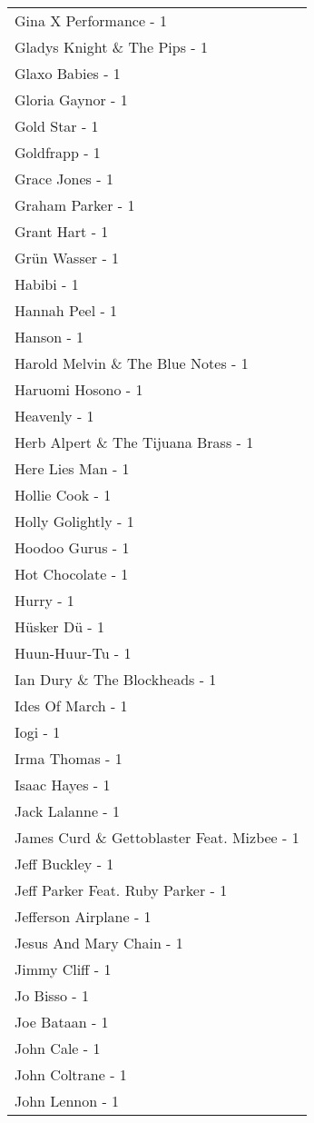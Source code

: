 \documentclass[
]{article}
\begin{document}
\begin{longtable}{l}
Gina X Performance - 1 \\ 
Gladys Knight \& The Pips - 1 \\ 
Glaxo Babies - 1 \\ 
Gloria Gaynor - 1 \\ 
Gold Star - 1 \\ 
Goldfrapp - 1 \\ 
Grace Jones - 1 \\ 
Graham Parker - 1 \\ 
Grant Hart - 1 \\ 
Grün Wasser - 1 \\ 
Habibi - 1 \\ 
Hannah Peel - 1 \\ 
Hanson - 1 \\ 
Harold Melvin \& The Blue Notes - 1 \\ 
Haruomi Hosono - 1 \\ 
Heavenly - 1 \\ 
Herb Alpert \& The Tijuana Brass - 1 \\ 
Here Lies Man - 1 \\ 
Hollie Cook - 1 \\ 
Holly Golightly - 1 \\ 
Hoodoo Gurus - 1 \\ 
Hot Chocolate - 1 \\ 
Hurry - 1 \\ 
Hüsker Dü - 1 \\ 
Huun-Huur-Tu - 1 \\ 
Ian Dury \& The Blockheads - 1 \\ 
Ides Of March - 1 \\ 
Iogi - 1 \\ 
Irma Thomas - 1 \\ 
Isaac Hayes - 1 \\ 
Jack Lalanne - 1 \\ 
James Curd \& Gettoblaster Feat. Mizbee - 1 \\ 
Jeff Buckley - 1 \\ 
Jeff Parker Feat. Ruby Parker - 1 \\ 
Jefferson Airplane - 1 \\ 
Jesus And Mary Chain - 1 \\ 
Jimmy Cliff - 1 \\ 
Jo Bisso - 1 \\ 
Joe Bataan - 1 \\ 
John Cale - 1 \\ 
John Coltrane - 1 \\ 
John Lennon - 1 \\ 

\end{longtable}
\end{document}
